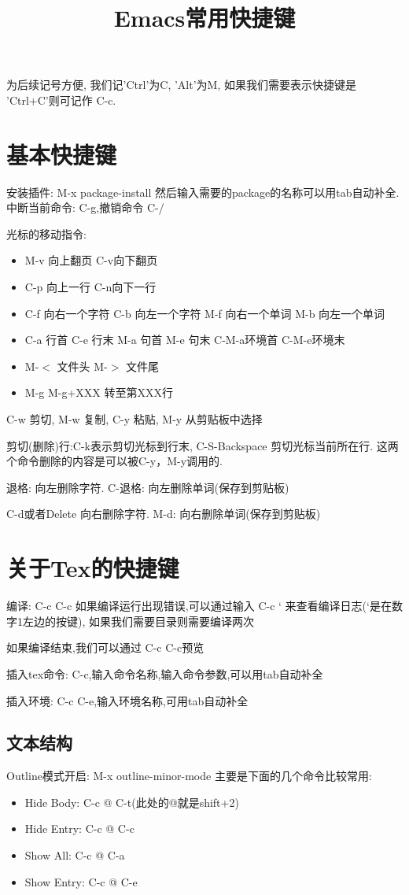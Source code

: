 \documentclass[UTF8]{ctexart}
\title{Emacs常用快捷键}
\date{}
\begin{document}
\maketitle
\tableofcontents

为后续记号方便, 我们记'Ctrl'为C, 'Alt'为M, 如果我们需要表示快捷键是 'Ctrl+C'则可记作 C-c.
\section{基本快捷键}
安装插件: M-x package-install 然后输入需要的package的名称可以用tab自动补全.
中断当前命令: C-g,撤销命令 C-/

光标的移动指令:
\begin{itemize}
\item M-v 向上翻页 C-v向下翻页
\item C-p 向上一行 C-n向下一行
\item C-f 向右一个字符 C-b 向左一个字符 M-f 向右一个单词 M-b 向左一个单词
\item C-a 行首 C-e 行末 M-a 句首 M-e 句末 C-M-a环境首 C-M-e环境末
\item M-$<$ 文件头 M-$>$ 文件尾
\item M-g M-g+XXX 转至第XXX行
\end{itemize}
C-w 剪切, M-w 复制, C-y 粘贴, M-y 从剪贴板中选择

剪切(删除)行:C-k表示剪切光标到行末, C-S-Backspace 剪切光标当前所在行. 这两个命令删除的内容是可以被C-y，M-y调用的.

退格: 向左删除字符. C-退格: 向左删除单词(保存到剪贴板)

C-d或者Delete 向右删除字符. M-d: 向右删除单词(保存到剪贴板)
\section{关于Tex的快捷键}
编译: C-c C-c 如果编译运行出现错误,可以通过输入 C-c ` 来查看编译日志(`是在数字1左边的按键), 如果我们需要目录则需要编译两次

如果编译结束,我们可以通过 C-c C-c预览

插入tex命令: C-c,输入命令名称,输入命令参数,可以用tab自动补全

插入环境: C-c C-e,输入环境名称,可用tab自动补全
\subsection{文本结构}
Outline模式开启: M-x outline-minor-mode
主要是下面的几个命令比较常用:
\begin{itemize}
\item Hide Body: C-c @ C-t(此处的@就是shift+2)

\item Hide Entry: C-c @ C-c

\item Show All: C-c @ C-a

\item Show Entry: C-c @ C-e
\end{itemize}
\end{document}
